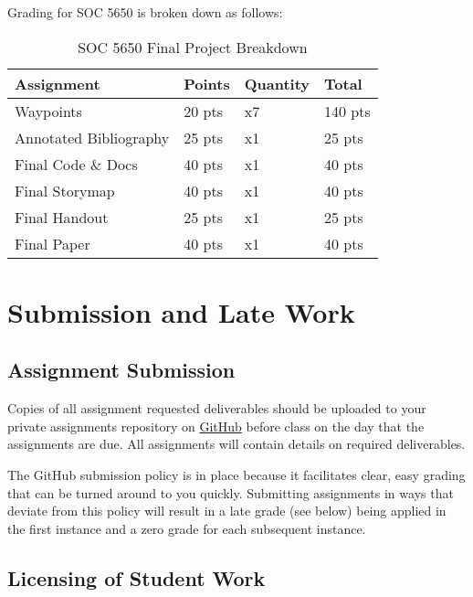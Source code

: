 \documentclass[
]{book}
\begin{document}
Grading for SOC 5650 is broken down as follows:

\begin{table}

\caption{\label{tab:unnamed-chunk-5}SOC 5650 Final Project Breakdown}
\centering
\begin{tabular}[t]{llll}
\toprule
Assignment & Points & Quantity & Total\\
\midrule
Waypoints & 20 pts & x7 & 140 pts\\
Annotated Bibliography & 25 pts & x1 & 25 pts\\
Final Code \& Docs & 40 pts & x1 & 40 pts\\
Final Storymap & 40 pts & x1 & 40 pts\\
Final Handout & 25 pts & x1 & 25 pts\\
\addlinespace
Final Paper & 40 pts & x1 & 40 pts\\
\bottomrule
\end{tabular}
\end{table}

\hypertarget{submission-and-late-work}{%
\section{Submission and Late Work}\label{submission-and-late-work}}

\hypertarget{assignment-submission}{%
\subsection{Assignment Submission}\label{assignment-submission}}

Copies of all assignment requested deliverables should be uploaded to your private assignments repository on \href{https://github.com/slu-soc5650}{GitHub} before class on the day that the assignments are due. All assignments will contain details on required deliverables.

The GitHub submission policy is in place because it facilitates clear, easy grading that can be turned around to you quickly. Submitting assignments in ways that deviate from this policy will result in a late grade (see below) being applied in the first instance and a zero grade for each subsequent instance.

\hypertarget{licensing-of-student-work}{%
\subsection{Licensing of Student Work}\label{licensing-of-student-work}}
\end{document}
